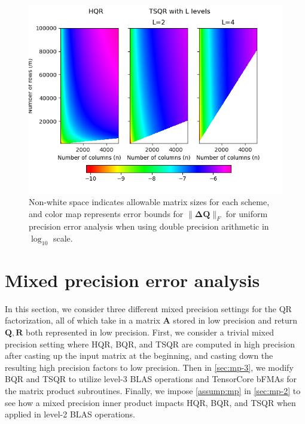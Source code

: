 \documentclass[review,onefignum,onetabnum]{siamart190516}
\newcommand{\bb}[1]{\mathbf{#1}}
\begin{document}
\begin{figure}
	\centering
	\includegraphics[width=.45\textwidth]{../figures/paramspace2.png}
	\caption{\label{fig:paramspace} Non-white space indicates allowable matrix sizes for each scheme, and color map represents error bounds for $\|\bb{\Delta Q}\|_F$ for uniform precision error analysis when using double precision arithmetic in $\log_{10}$ scale.}
	\vspace{-10pt}	
\end{figure}
\section{Mixed precision error analysis}\label{sec:mpanalysis}
%
In this section, we consider three different mixed precision settings for the QR factorization, all of which take in a matrix $\bb{A}$ stored in low precision and return $\bb{Q},\bb{R}$ both represented in low precision. 
First, we consider a trivial mixed precision setting where HQR, BQR, and TSQR are computed in high precision after casting up the input matrix at the beginning, and casting down the resulting high precision factors to low precision. 
Then in \cref{sec:mp-3}, we modify BQR and TSQR to utilize level-3 BLAS operations and TensorCore bFMAs for the matrix product subroutines. 
Finally, we impose \cref{assump:mp} in \cref{sec:mp-2} to see how a mixed precision inner product impacts HQR, BQR, and TSQR when applied in level-2 BLAS operations.
\end{document}

